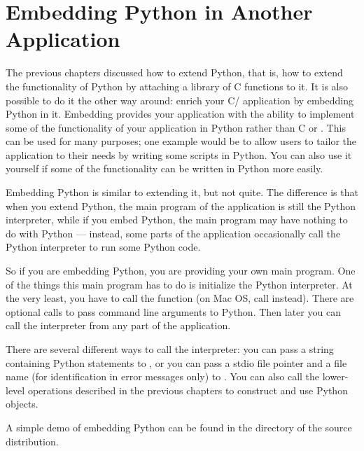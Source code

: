 \chapter{Embedding Python in Another Application
     \label{embedding}}

The previous chapters discussed how to extend Python, that is, how to
extend the functionality of Python by attaching a library of C
functions to it.  It is also possible to do it the other way around:
enrich your C/\Cpp{} application by embedding Python in it.  Embedding
provides your application with the ability to implement some of the
functionality of your application in Python rather than C or \Cpp.
This can be used for many purposes; one example would be to allow
users to tailor the application to their needs by writing some scripts
in Python.  You can also use it yourself if some of the functionality
can be written in Python more easily.

Embedding Python is similar to extending it, but not quite.  The
difference is that when you extend Python, the main program of the
application is still the Python interpreter, while if you embed
Python, the main program may have nothing to do with Python ---
instead, some parts of the application occasionally call the Python
interpreter to run some Python code.

So if you are embedding Python, you are providing your own main
program.  One of the things this main program has to do is initialize
the Python interpreter.  At the very least, you have to call the
function  (on Mac OS, call
 instead).  There are optional calls to
pass command line arguments to Python.  Then later you can call the
interpreter from any part of the application.

There are several different ways to call the interpreter: you can pass
a string containing Python statements to
, or you can pass a stdio file pointer
and a file name (for identification in error messages only) to
.  You can also call the lower-level
operations described in the previous chapters to construct and use
Python objects.

A simple demo of embedding Python can be found in the directory
 of the source distribution.


\begin{seealso}
\end{seealso}


